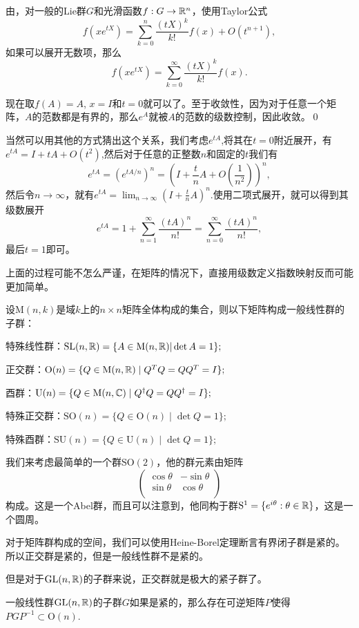 \proof 由，对一般的Lie群$G$和光滑函数$f:G\to \mathbb{R}^n$，使用Taylor公式
\[
	f(xe^{tX})=\sum_{k=0}^n\frac{(tX)^{k}}{k!}f(x)+O(t^{n+1}),
\]
如果可以展开无数项，那么
\[
	f(xe^{tX})=\sum_{k=0}^\infty\frac{(tX)^{k}}{k!}f(x).
\]

现在取$f(A)=A$, $x=I$和$t=0$就可以了。至于收敛性，因为对于任意一个矩阵，$A$的范数都是有界的，那么$e^A$就被$A$的范数的级数控制，因此收敛。\qed

当然可以用其他的方式猜出这个关系，我们考虑$e^{tA}$,将其在$t=0$附近展开，有$e^{tA}=I+tA+O(t^2)$,然后对于任意的正整数$n$和固定的$t$我们有
\[
	e^{tA}=\left(e^{tA/n}\right)^n=\left(I+\frac{t}{n}A+O\left(\frac{1}{n^2}\right)\right)^n,
\]
然后令$n\to\infty$，就有$e^{tA}=\lim_{n\to\infty}\left(I+\frac{t}{n}A\right)^n$.使用二项式展开，就可以得到其级数展开
\[
	e^{tA}=1+\sum_{n=1}^\infty \frac{(tA)^n}{n!}=\sum_{n=0}^\infty \frac{(tA)^n}{n!},
\]
最后$t=1$即可。

上面的过程可能不怎么严谨，在矩阵的情况下，直接用级数定义指数映射反而可能更加简单。

\para 设$\mathrm{M}(n,k)$是域$k$上的$n\times n$矩阵全体构成的集合，则以下矩阵构成一般线性群的子群：

 特殊线性群：$\mathrm{SL}(n,\mathbb{R})=\{A\in \mathrm{M}(n,\mathbb{R})|\det A=1\};$

 正交群：$\mathrm{O}(n) = \{ Q \in \mathrm{M}(n,\mathbb{R}) \mid Q^T Q = Q Q^T = I \};$

 酉群：$\mathrm{U}(n) = \{ Q \in \mathrm{M}(n,\mathbb{C}) \mid Q^\dag Q = Q Q^\dag = I \};$

 特殊正交群：$\mathrm{SO}(n) =\{ Q \in \mathrm{O}(n) \mid \det Q=1 \};$

 特殊酉群：$\mathrm{SU}(n) =\{ Q \in \mathrm{U}(n) \mid \det Q=1 \};$

我们来考虑最简单的一个群$\mathrm{SO}(2)$，他的群元素由矩阵
\[
	\begin{pmatrix}
	\cos \theta&-\sin \theta\\
	\sin \theta&\cos \theta\\
	\end{pmatrix}
\]
构成。这是一个Abel群，而且可以注意到，他同构于群$\mathrm{S}^1=\{e^{i\theta}:\theta\in\mathbb{R}\}$，这是一个圆周。

\pro 对于矩阵群构成的空间，我们可以使用Heine-Borel定理断言有界闭子群是紧的。所以正交群是紧的，但是一般线性群不是紧的。

但是对于$\mathrm{GL}(n,\mathbb{R})$的子群来说，正交群就是极大的紧子群了。

\pro 一般线性群$\mathrm{GL}(n,\mathbb{R})$的子群$G$如果是紧的，那么存在可逆矩阵$P$使得$PGP^{-1}\subset \mathrm{O}(n)$.

